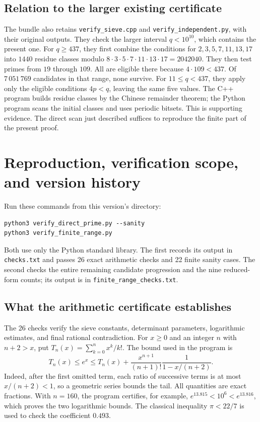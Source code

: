 \documentclass[11pt]{article}
\begin{document}
\subsection{Relation to the larger existing certificate}

The bundle also retains \texttt{verify\_sieve.cpp} and
\texttt{verify\_independent.py}, with their original outputs. They check
the larger interval \(q<10^{10}\), which contains the present one.
For \(q\ge437\), they first combine the conditions for
\(2,3,5,7,11,13,17\) into \(1440\) residue classes modulo
\(8\cdot3\cdot5\cdot7\cdot11\cdot13\cdot17=2042040\).
They then test primes from \(19\) through \(109\). All are eligible
there because \(4\cdot109<437\). Of \(7\,051\,769\) candidates in that
range, none survive. For \(11\le q<437\), they apply only the eligible
conditions \(4p<q\), leaving the same five values.
The C++ program builds residue classes by the Chinese remainder theorem;
the Python program scans the initial classes and uses periodic bitsets.
This is supporting evidence. The direct scan just described suffices
to reproduce the finite part of the present proof.

\section{Reproduction, verification scope, and version history}\label{reproduce}

Run these commands from this version's directory:
\begin{verbatim}
python3 verify_direct_prime.py --sanity
python3 verify_finite_range.py
\end{verbatim}
Both use only the Python standard library.
The first records its output in \texttt{checks.txt} and passes 26 exact
arithmetic checks and 22 finite sanity cases.
The second checks the entire remaining candidate progression and the
nine reduced-form counts; its output is in
\texttt{finite\_range\_checks.txt}.

\subsection{What the arithmetic certificate establishes}

The 26 checks verify the sieve constants, determinant parameters,
logarithmic estimates, and final rational contradiction. For
\(x\ge0\) and an integer \(n\) with \(n+2>x\), put
\(T_n(x)=\sum_{k=0}^n x^k/k!\). The bound used in the program is
\[
 T_n(x)\le e^x\le T_n(x)+
 \frac{x^{n+1}}{(n+1)!}\frac1{1-x/(n+2)}.
\]
Indeed, after the first omitted term, each ratio of successive terms
is at most \(x/(n+2)<1\), so a geometric series bounds the tail.
All quantities are exact fractions. With \(n=160\), the program
certifies, for example, \(e^{13.815}<10^6<e^{13.816}\), which proves
the two logarithmic bounds. The classical inequality \(\pi<22/7\)
is used to check the coefficient \(0.493\).
\end{document}
